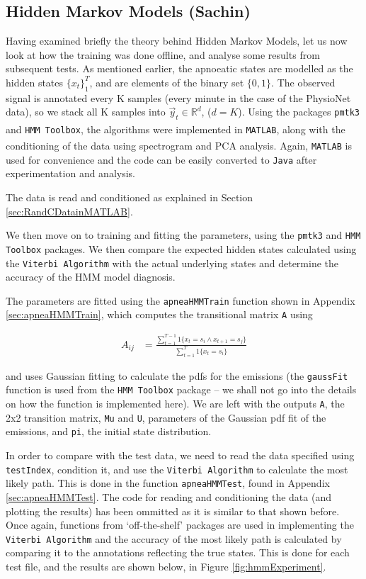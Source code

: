 \subsection{Hidden Markov Models (Sachin)}
\label{sec:hmmExperiments-sachin}

Having examined briefly the theory behind Hidden Markov Models, let us now look at how the training was done offline, and analyse some results from subsequent tests. As mentioned earlier, the apnoeatic states are modelled as the hidden states $\{x_t\}_1^T$, and are elements of the binary set $\{0, 1\}$. The observed signal is annotated every K samples (every minute in the case of the PhysioNet data), so we stack all K samples into $\vec y_t \in \mathbb{R}^d$, ($d = K$). Using the packages \verb!pmtk3! and \verb!HMM Toolbox!, the algorithms were implemented in \verb!MATLAB!\textsuperscript{\textregistered}, along with the conditioning of the data using spectrogram and PCA analysis. Again, \verb!MATLAB!\textsuperscript{\textregistered} is used for convenience and the code can be easily converted to \verb!Java! after experimentation and analysis.

The data is read and conditioned as explained in Section \ref{sec:RandCDatainMATLAB}.

We then move on to training and fitting the parameters, using the \verb!pmtk3! and \verb!HMM Toolbox! packages. We then compare the expected hidden states calculated using the \verb!Viterbi Algorithm! with the actual underlying states and determine the accuracy of the HMM model diagnosis.

The parameters are fitted using the \verb!apneaHMMTrain! function shown in Appendix \ref{sec:apneaHMMTrain}, which computes the transitional matrix \verb!A! using

\begin{align}
		A_{ij} & = \frac{\sum_{t = 1}^{T - 1} 1\{x_t = s_i \land x_{t + 1} = s_j\}}{\sum_{t = 1}^{T} 1\{x_t = s_i\}}
\end{align}

and uses Gaussian fitting to calculate the pdfs for the emissions (the \verb!gaussFit! function is used from the \verb!HMM Toolbox! package -- we shall not go into the details on how the function is implemented here). We are left with the outputs \verb!A!, the 2x2 transition matrix, \verb!Mu! and \verb!U!, parameters of the Gaussian pdf fit of the emissions, and \verb!pi!, the initial state distribution.

In order to compare with the test data, we need to read the data specified using \verb!testIndex!, condition it, and use the \verb!Viterbi Algorithm! to calculate the most likely path. This is done in the function \verb!apneaHMMTest!, found in Appendix \ref{sec:apneaHMMTest}. The code for reading and conditioning the data (and plotting the results) has been ommitted as it is similar to that shown before. Once again, functions from `off-the-shelf' packages are used in implementing the \verb!Viterbi Algorithm! and the accuracy of the most likely path is calculated by comparing it to the annotations reflecting the true states. This is done for each test file, and the results are shown below, in Figure \ref{fig:hmmExperiment}.

